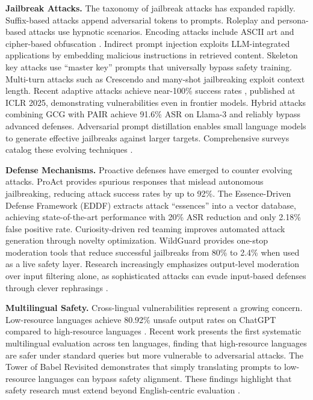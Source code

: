 \documentclass{article}
\begin{document}
\textbf{Jailbreak Attacks.} The taxonomy of jailbreak attacks has expanded rapidly. Suffix-based attacks \cite{zou2023universal} append adversarial tokens to prompts. Roleplay and persona-based attacks \cite{li2024deepinception} use hypnotic scenarios. Encoding attacks include ASCII art \cite{jiang2024artprompt} and cipher-based obfuscation \cite{yuan2024gpt4}. Indirect prompt injection \cite{greshake2023prompt} exploits LLM-integrated applications by embedding malicious instructions in retrieved content. Skeleton key attacks \cite{microsoft2024skeleton} use ``master key'' prompts that universally bypass safety training. Multi-turn attacks such as Crescendo \cite{russinovich2024great} and many-shot jailbreaking \cite{anil2024many} exploit context length. Recent adaptive attacks achieve near-100\% success rates \cite{andriushchenko2025adaptive}, published at ICLR 2025, demonstrating vulnerabilities even in frontier models. Hybrid attacks \cite{chen2025hybrid_jailbreak} combining GCG with PAIR achieve 91.6\% ASR on Llama-3 and reliably bypass advanced defenses. Adversarial prompt distillation \cite{zhang2025adversarial_distill} enables small language models to generate effective jailbreaks against larger targets. Comprehensive surveys catalog these evolving techniques \cite{xu2024jailbreak_survey, chu2024comprehensive}.

\textbf{Defense Mechanisms.} Proactive defenses have emerged to counter evolving attacks. ProAct \cite{zhou2024proactive} provides spurious responses that mislead autonomous jailbreaking, reducing attack success rates by up to 92\%. The Essence-Driven Defense Framework (EDDF) \cite{wang2025eddf} extracts attack ``essences'' into a vector database, achieving state-of-the-art performance with 20\% ASR reduction and only 2.18\% false positive rate. Curiosity-driven red teaming \cite{hong2024curiosity_redteam} improves automated attack generation through novelty optimization. WildGuard \cite{han2024wildguard} provides one-stop moderation tools that reduce successful jailbreaks from 80\% to 2.4\% when used as a live safety layer. Research increasingly emphasizes output-level moderation over input filtering alone, as sophisticated attacks can evade input-based defenses through clever rephrasings \cite{wu2025content_mod_review}.

\textbf{Multilingual Safety.} Cross-lingual vulnerabilities represent a growing concern. Low-resource languages achieve 80.92\% unsafe output rates on ChatGPT compared to high-resource languages \cite{deng2024multilingual}. Recent work \cite{deng2025cross_lingual} presents the first systematic multilingual evaluation across ten languages, finding that high-resource languages are safer under standard queries but more vulnerable to adversarial attacks. The Tower of Babel Revisited \cite{zhang2025tower_babel} demonstrates that simply translating prompts to low-resource languages can bypass safety alignment. These findings highlight that safety research must extend beyond English-centric evaluation \cite{kumar2024multilingual_toxicity, wang2024rtplx, wu2025linguasafe}.
\end{document}
